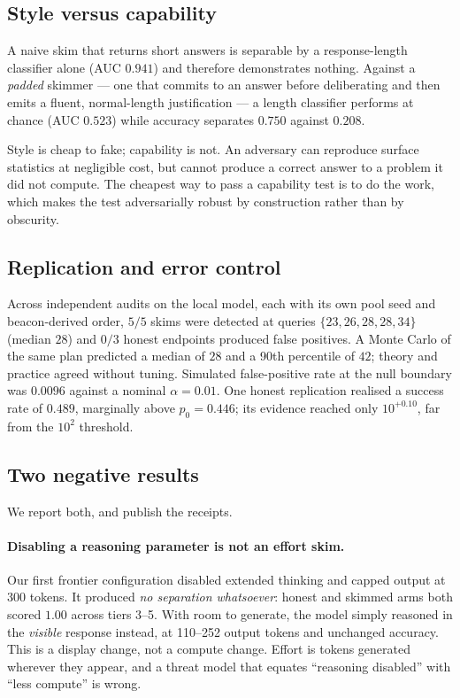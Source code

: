 \documentclass[11pt]{article}
\theoremstyle{definition}
\begin{document}
\subsection{Style versus capability}

A naive skim that returns short answers is separable by a response-length
classifier alone (AUC $0.941$) and therefore demonstrates nothing. Against a
\emph{padded} skimmer --- one that commits to an answer before deliberating and
then emits a fluent, normal-length justification --- a length classifier
performs at chance (AUC $0.523$) while accuracy separates $0.750$ against
$0.208$.

Style is cheap to fake; capability is not. An adversary can reproduce surface
statistics at negligible cost, but cannot produce a correct answer to a problem
it did not compute. The cheapest way to pass a capability test is to do the
work, which makes the test adversarially robust by construction rather than by
obscurity.

\subsection{Replication and error control}

Across independent audits on the local model, each with its own pool seed and
beacon-derived order, $5/5$ skims were detected at queries
$\{23, 26, 28, 28, 34\}$ (median $28$) and $0/3$ honest endpoints produced false
positives. A Monte Carlo of the same plan predicted a median of $28$ and a 90th
percentile of $42$; theory and practice agreed without tuning. Simulated
false-positive rate at the null boundary was $0.0096$ against a nominal
$\alpha = 0.01$. One honest replication realised a success rate of $0.489$,
marginally above $p_0 = 0.446$; its evidence reached only $10^{+0.10}$, far from
the $10^{2}$ threshold.

\subsection{Two negative results}
\label{sec:negative}

We report both, and publish the receipts.

\paragraph{Disabling a reasoning parameter is not an effort skim.} Our first
frontier configuration disabled extended thinking and capped output at 300
tokens. It produced \emph{no separation whatsoever}: honest and skimmed arms both
scored $1.00$ across tiers 3--5. With room to generate, the model simply reasoned
in the \emph{visible} response instead, at 110--252 output tokens and unchanged
accuracy. This is a display change, not a compute change. Effort is tokens
generated wherever they appear, and a threat model that equates ``reasoning
disabled'' with ``less compute'' is wrong.
\end{document}

